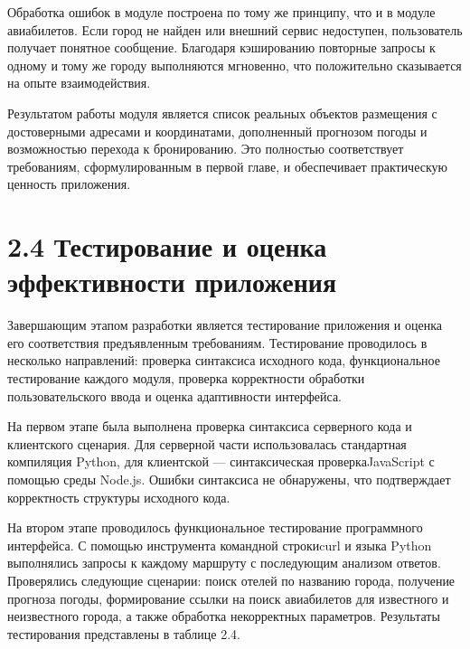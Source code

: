 \documentclass[14pt,a4paper,oneside]{extreport}
\begin{document}
Обработка ошибок в модуле построена по тому же принципу, что и в модуле авиабилетов. Если город не найден или внешний сервис недоступен, пользователь получает понятное сообщение. Благодаря кэшированию повторные запросы к одному и тому же городу выполняются мгновенно, что положительно сказывается на опыте взаимодействия.

Результатом работы модуля является список реальных объектов размещения с достоверными адресами и координатами, дополненный прогнозом погоды и возможностью перехода к бронированию. Это полностью соответствует требованиям, сформулированным в первой главе, и обеспечивает практическую ценность приложения.


\section*{2.4 Тестирование и оценка эффективности приложения}

Завершающим этапом разработки является тестирование приложения и оценка его соответствия предъявленным требованиям. Тестирование проводилось в несколько направлений: проверка синтаксиса исходного кода, функциональное тестирование каждого модуля, проверка корректности обработки пользовательского ввода и оценка адаптивности интерфейса.

На первом этапе была выполнена проверка синтаксиса серверного кода и клиентского сценария. Для серверной части использовалась стандартная компиляция Python, для клиентской — синтаксическая проверкаJavaScript с помощью среды Node.js. Ошибки синтаксиса не обнаружены, что подтверждает корректность структуры исходного кода.

На втором этапе проводилось функциональное тестирование программного интерфейса. С помощью инструмента командной строкиcurl и языка Python выполнялись запросы к каждому маршруту с последующим анализом ответов. Проверялись следующие сценарии: поиск отелей по названию города, получение прогноза погоды, формирование ссылки на поиск авиабилетов для известного и неизвестного города, а также обработка некорректных параметров. Результаты тестирования представлены в таблице 2.4.
\end{document}
